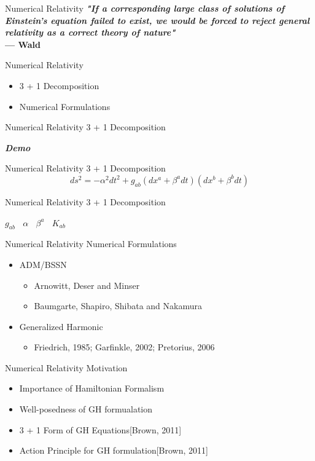 \documentclass[xcolor=dvipsnames]{beamer}
\begin{document}
	\begin{frame}{Numerical Relativity}
		\textbf{\textit{"If a corresponding large class of solutions of Einstein’s equation failed to exist, we would be forced to reject general relativity as a correct theory of nature"}}\\
		\hfill \textbf{--- Wald}
	\end{frame}
	\begin{frame}{Numerical Relativity}
		\begin{itemize}
			\item{3 + 1 Decomposition}
			\item{Numerical Formulations}
		\end{itemize}
	\end{frame}
	\begin{frame}{Numerical Relativity}
		3 + 1 Decomposition
		\begin{center}
			\Huge{\textbf{\textit{Demo}}}
		\end{center}
	\end{frame}
	\begin{frame}{Numerical Relativity}
		3 + 1 Decomposition
		\Large
		\[
		ds^{2} = - \alpha^{2}dt^{2} + g_{ab}(dx^{a} + \beta^{a}dt)(dx^{b} + \beta^{b}dt) 		
		\]
	\end{frame}
	\begin{frame}{Numerical Relativity}
		3 + 1 Decomposition
		\begin{center}
			\Large
			$g_{ab}~~~~\alpha~~~~\beta^{a}~~~~K_{ab}$
		\end{center}
	\end{frame}
	\begin{frame}{Numerical Relativity}
		Numerical Formulations
		\begin{itemize}
			\pause
			\item{ADM/BSSN}
			\pause
			\begin{itemize}
				\item{Arnowitt, Deser and Minser}
			\pause
				\item{Baumgarte, Shapiro, Shibata and Nakamura}
			\end{itemize}
			\pause
			\item{Generalized Harmonic}
			\pause
			\begin{itemize}
				\item{Friedrich, 1985; Garfinkle, 2002; Pretorius, 2006}
			\end{itemize}
		\end{itemize}
	\end{frame}
	\begin{frame}{Numerical Relativity}
		Motivation
		\begin{itemize}
			\item{Importance of Hamiltonian Formalism}
			\item{Well-posedness of GH formualation}
			\pause
			\item{3 + 1 Form of GH Equations[Brown, 2011]}
			\item{Action Principle for GH formulation[Brown, 2011]}
		\end{itemize}
	\end{frame}
\end{document}
